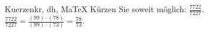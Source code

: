 \begin{MAufgabe}{Kuerzen}{kr, dh, MaTeX}
K\"urzen Sie soweit m\"oglich: $\frac{7722}{7227}$.\\ 
\ifLsg\MLoesung
\quad $\frac{7722}{7227}=\frac{(99)\cdot(78)}{(99)\cdot(73)}=\frac{78}{73}$.\else\relax\fi
 \end{MAufgabe}